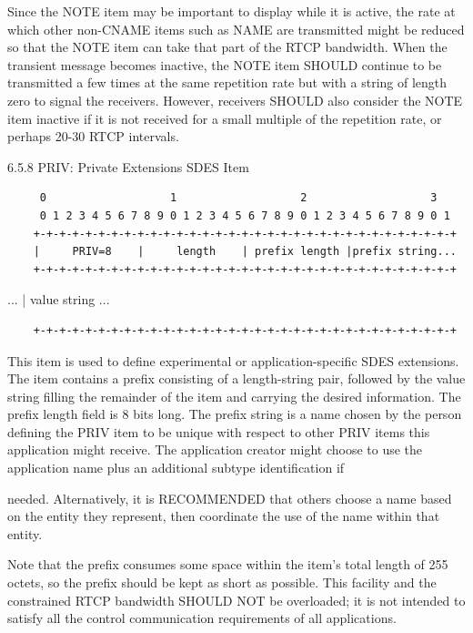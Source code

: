 \documentclass{article}
\begin{document}
Since the NOTE item may be important to display while it is active, the rate at which other non-CNAME items such as NAME are transmitted might be reduced so that the NOTE item can take that part of the RTCP bandwidth.  When the transient message becomes inactive, the NOTE item SHOULD continue to be transmitted a few times at the same repetition rate but with a string of length zero to signal the receivers.  However, receivers SHOULD also consider the NOTE item inactive if it is not received for a small multiple of the repetition rate, or perhaps 20-30 RTCP intervals.

6.5.8 PRIV: Private Extensions SDES Item

\begin{verbatim}
     0                   1                   2                   3
     0 1 2 3 4 5 6 7 8 9 0 1 2 3 4 5 6 7 8 9 0 1 2 3 4 5 6 7 8 9 0 1
    +-+-+-+-+-+-+-+-+-+-+-+-+-+-+-+-+-+-+-+-+-+-+-+-+-+-+-+-+-+-+-+-+
    |     PRIV=8    |     length    | prefix length |prefix string...
    +-+-+-+-+-+-+-+-+-+-+-+-+-+-+-+-+-+-+-+-+-+-+-+-+-+-+-+-+-+-+-+-+
\end{verbatim}

...             |                  value string               ...

\begin{verbatim}
    +-+-+-+-+-+-+-+-+-+-+-+-+-+-+-+-+-+-+-+-+-+-+-+-+-+-+-+-+-+-+-+-+
\end{verbatim}

This item is used to define experimental or application-specific SDES extensions.  The item contains a prefix consisting of a length-string pair, followed by the value string filling the remainder of the item and carrying the desired information.  The prefix length field is 8 bits long.  The prefix string is a name chosen by the person defining the PRIV item to be unique with respect to other PRIV items this application might receive.  The application creator might choose to use the application name plus an additional subtype identification if

needed.  Alternatively, it is RECOMMENDED that others choose a name based on the entity they represent, then coordinate the use of the name within that entity.

Note that the prefix consumes some space within the item's total length of 255 octets, so the prefix should be kept as short as possible.  This facility and the constrained RTCP bandwidth SHOULD NOT be overloaded; it is not intended to satisfy all the control communication requirements of all applications.
\end{document}
